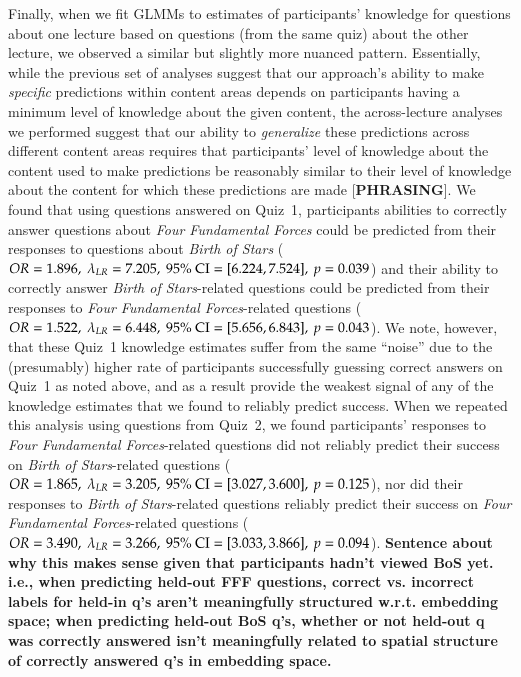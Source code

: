 \documentclass[10pt]{article}
\begin{document}
Finally, when we fit GLMMs to estimates of participants' knowledge for questions about one lecture based on questions (from the same quiz) about the other lecture, we observed a similar but slightly more nuanced pattern. 
Essentially, while the previous set of analyses suggest that our approach's ability to make \textit{specific} predictions within content areas depends on participants having a minimum level of knowledge about the given content, the across-lecture analyses we performed suggest that our ability to \textit{generalize} these predictions across different content areas requires that participants' level of knowledge about the content used to make predictions be reasonably similar to their level of knowledge about the content for which these predictions are made [\textbf{PHRASING}].
We found that using questions answered on Quiz~1, participants abilities to correctly answer questions about \textit{Four Fundamental Forces} could be predicted from their responses to questions about \textit{Birth of Stars} ($OR = 1.896,\ \lambda_{LR} = 7.205,\ 95\%\ \textnormal{CI} = [6.224, 7.524],\ p = 0.039$) and their ability to correctly answer \textit{Birth of Stars}-related questions could be predicted from their responses to \textit{Four Fundamental Forces}-related questions ($OR = 1.522,\ \lambda_{LR} =  6.448,\ 95\%\ \textnormal{CI} = [5.656, 6.843],\ p = 0.043$).
We note, however, that these Quiz~1 knowledge estimates suffer from the same ``noise'' due to the (presumably) higher rate of participants successfully guessing correct answers on Quiz~1 as noted above, and as a result provide the weakest signal of any of the knowledge estimates that we found to reliably predict success.
When we repeated this analysis using questions from Quiz~2, we found participants' responses to \textit{Four Fundamental Forces}-related questions did not reliably predict their success on \textit{Birth of Stars}-related questions ($OR = 1.865,\ \lambda_{LR} = 3.205,\ 95\%\ \textnormal{CI} = [3.027, 3.600],\ p = 0.125$), nor did their responses to \textit{Birth of Stars}-related questions reliably predict their success on \textit{Four Fundamental Forces}-related questions ($OR = 3.490,\ \lambda_{LR} = 3.266,\ 95\%\ \textnormal{CI} = [3.033, 3.866],\ p = 0.094$). 
\textbf{Sentence about why this makes sense given that participants hadn't viewed BoS yet. i.e., when predicting held-out FFF questions, correct vs. incorrect labels for held-in q's aren't meaningfully structured w.r.t. embedding space; when predicting held-out BoS q's, whether or not held-out q was correctly answered isn't meaningfully related to spatial structure of correctly answered q's in embedding space.}
\end{document}

